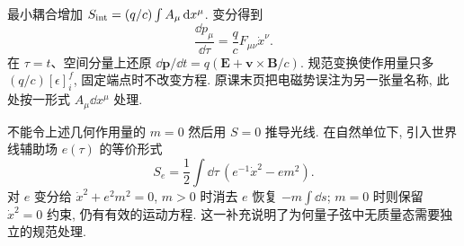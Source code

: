 最小耦合增加 $S_{\rm int}=(q/c)\int A_\mu\,\mathrm d x^\mu$. 变分得到
\[
 \frac{\dd p_\mu}{\dd\tau}=\frac qcF_{\mu\nu}\dot x^\nu.
\]
在 $\tau=t$、空间分量上还原 $\dd\boldsymbol p/\dd t=q(\boldsymbol E+\boldsymbol v\times\boldsymbol B/c)$. 规范变换使作用量只多 $(q/c)[\epsilon]_{i}^{f}$, 固定端点时不改变方程. 原课末页把电磁势误注为另一张量名称, 此处按一形式 $A_\mu\dd x^\mu$ 处理.

不能令上述几何作用量的 $m=0$ 然后用 $S=0$ 推导光线. 在自然单位下, 引入世界线辅助场 $e(\tau)$ 的等价形式
\[
 S_e=\frac12\int\dd\tau\,(e^{-1}\dot x^2-e m^2).
\]
对 $e$ 变分给 $\dot x^2+e^2m^2=0$, $m>0$ 时消去 $e$ 恢复 $-m\int\dd s$; $m=0$ 时则保留 $\dot x^2=0$ 约束, 仍有有效的运动方程. 这一补充说明了为何量子弦中无质量态需要独立的规范处理.
